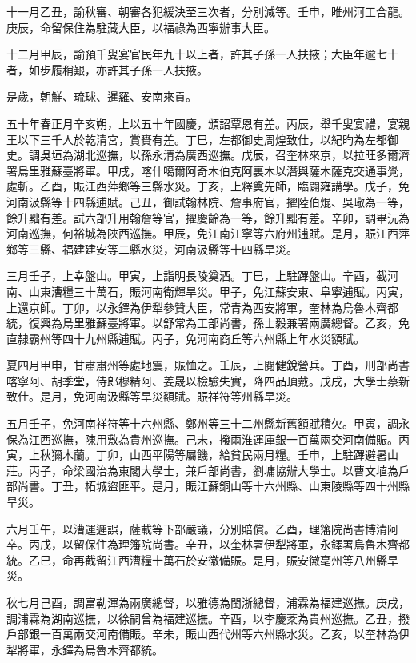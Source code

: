 \begin{pinyinscope}
十一月乙丑，諭秋審、朝審各犯緩決至三次者，分別減等。壬申，睢州河工合龍。庚辰，命留保住為駐藏大臣，以福祿為西寧辦事大臣。

十二月甲辰，諭預千叟宴官民年九十以上者，許其子孫一人扶掖；大臣年逾七十者，如步履稍艱，亦許其子孫一人扶掖。

是歲，朝鮮、琉球、暹羅、安南來貢。

五十年春正月辛亥朔，上以五十年國慶，頒詔覃恩有差。丙辰，舉千叟宴禮，宴親王以下三千人於乾清宮，賞賚有差。丁巳，左都御史周煌致仕，以紀昀為左都御史。調吳垣為湖北巡撫，以孫永清為廣西巡撫。戊辰，召奎林來京，以拉旺多爾濟署烏里雅蘇臺將軍。甲戌，喀什噶爾阿奇木伯克阿裏木以潛與薩木薩克交通事覺，處斬。乙酉，賑江西萍鄉等三縣水災。丁亥，上釋奠先師，臨闢雍講學。戊子，免河南汲縣等十四縣逋賦。己丑，御試翰林院、詹事府官，擢陸伯焜、吳璥為一等，餘升黜有差。試六部升用翰詹等官，擢慶齡為一等，餘升黜有差。辛卯，調畢沅為河南巡撫，何裕城為陜西巡撫。甲辰，免江南江寧等六府州逋賦。是月，賑江西萍鄉等三縣、福建建安等二縣水災，河南汲縣等十四縣旱災。

三月壬子，上幸盤山。甲寅，上詣明長陵奠酒。丁巳，上駐蹕盤山。辛酉，截河南、山東漕糧三十萬石，賑河南衛輝旱災。甲子，免江蘇安東、阜寧逋賦。丙寅，上還京師。丁卯，以永鐸為伊犁參贊大臣，常青為西安將軍，奎林為烏魯木齊都統，復興為烏里雅蘇臺將軍。以舒常為工部尚書，孫士毅兼署兩廣總督。乙亥，免直隸霸州等四十九州縣逋賦。丙子，免河南商丘等六州縣上年水災額賦。

夏四月甲申，甘肅肅州等處地震，賑恤之。壬辰，上閱健銳營兵。丁酉，刑部尚書喀寧阿、胡季堂，侍郎穆精阿、姜晟以檢驗失實，降四品頂戴。戊戌，大學士蔡新致仕。是月，免河南汲縣等旱災額賦。賑祥符等州縣旱災。

五月壬子，免河南祥符等十六州縣、鄭州等三十二州縣新舊額賦積欠。甲寅，調永保為江西巡撫，陳用敷為貴州巡撫。己未，撥兩淮運庫銀一百萬兩交河南備賑。丙寅，上秋獮木蘭。丁卯，山西平陽等屬饑，給貧民兩月糧。壬申，上駐蹕避暑山莊。丙子，命梁國治為東閣大學士，兼戶部尚書，劉墉協辦大學士。以曹文埴為戶部尚書。丁丑，柘城盜匪平。是月，賑江蘇銅山等十六州縣、山東陵縣等四十州縣旱災。

六月壬午，以漕運遲誤，薩載等下部嚴議，分別賠償。乙酉，理籓院尚書博清阿卒。丙戌，以留保住為理籓院尚書。辛丑，以奎林署伊犁將軍，永鐸署烏魯木齊都統。乙巳，命再截留江西漕糧十萬石於安徽備賑。是月，賑安徽亳州等八州縣旱災。

秋七月己酉，調富勒渾為兩廣總督，以雅德為閩浙總督，浦霖為福建巡撫。庚戌，調浦霖為湖南巡撫，以徐嗣曾為福建巡撫。辛酉，以李慶棻為貴州巡撫。乙丑，撥戶部銀一百萬兩交河南備賑。辛未，賑山西代州等六州縣水災。乙亥，以奎林為伊犁將軍，永鐸為烏魯木齊都統。


\end{pinyinscope}

